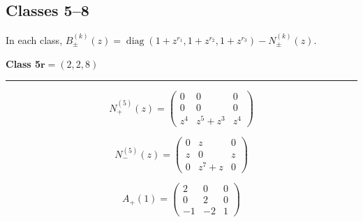 \subsection*{Classes 5--8}
\noindent In each class, $B_\pm^{(k)}(z)=\operatorname{diag}(1+z^{r_1},1+z^{r_2},1+z^{r_3})-N_\pm^{(k)}(z)$.\par\medskip
\noindent\begin{minipage}{\linewidth}
\noindent\textbf{Class 5}\hfill $\symbf{r}=(2,2,8)$
\par\smallskip\noindent\textcolor{rulegray}{\rule{\linewidth}{0.3pt}}
\begin{minipage}[c]{0.495\linewidth}\centering\fontsize{10.5}{13}\selectfont
\setlength{\abovedisplayskip}{3pt}\setlength{\belowdisplayskip}{3pt}
\setlength{\abovedisplayshortskip}{3pt}\setlength{\belowdisplayshortskip}{3pt}
\setlength{\arraycolsep}{3.5pt}\renewcommand{\arraystretch}{1.18}
\[N_{+}^{(5)}(z)=\begin{pmatrix}0 & 0 & 0\\0 & 0 & 0\\z^{4} & z^{5} + z^{3} & z^{4}\end{pmatrix}\]
\end{minipage}%
\begin{minipage}[c]{0.495\linewidth}\centering\fontsize{10.5}{13}\selectfont
\setlength{\abovedisplayskip}{3pt}\setlength{\belowdisplayskip}{3pt}
\setlength{\abovedisplayshortskip}{3pt}\setlength{\belowdisplayshortskip}{3pt}
\setlength{\arraycolsep}{3.5pt}\renewcommand{\arraystretch}{1.18}
\[N_{-}^{(5)}(z)=\begin{pmatrix}0 & z & 0\\z & 0 & z\\0 & z^{7} + z & 0\end{pmatrix}\]
\end{minipage}%
\par\noindent
\begin{minipage}[c]{0.495\linewidth}\centering\fontsize{10.5}{13}\selectfont
\setlength{\abovedisplayskip}{3pt}\setlength{\belowdisplayskip}{3pt}
\setlength{\abovedisplayshortskip}{3pt}\setlength{\belowdisplayshortskip}{3pt}
\setlength{\arraycolsep}{3.5pt}\renewcommand{\arraystretch}{1.18}
\[A_{+}(1)=\begin{pmatrix}2 & 0 & 0\\0 & 2 & 0\\-1 & -2 & 1\end{pmatrix}\]
\end{minipage}%
\begin{minipage}[c]{0.495\linewidth}\centering\fontsize{10.5}{13}\selectfont

\end{minipage}
\end{minipage}
